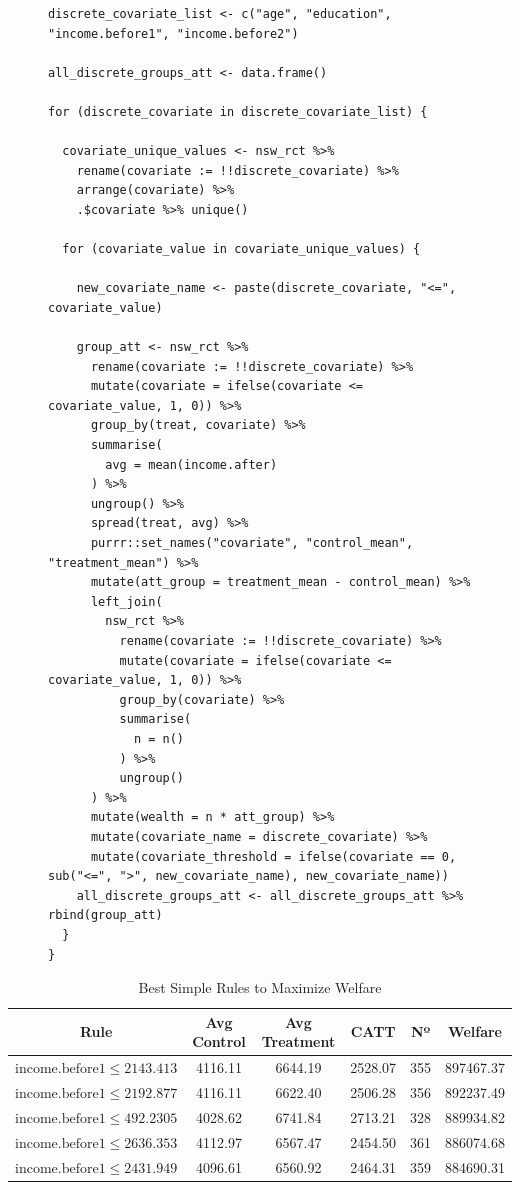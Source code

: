 \documentclass{article}
\begin{document}
\begin{figure}[H]
\centering
\begin{lstlisting}[style=Rstyle, caption=Continous Variables Threshold Search]
discrete_covariate_list <- c("age", "education", "income.before1", "income.before2")

all_discrete_groups_att <- data.frame()

for (discrete_covariate in discrete_covariate_list) {
  
  covariate_unique_values <- nsw_rct %>%
    rename(covariate := !!discrete_covariate) %>%
    arrange(covariate) %>% 
    .$covariate %>% unique()
  
  for (covariate_value in covariate_unique_values) {
    
    new_covariate_name <- paste(discrete_covariate, "<=", covariate_value)
    
    group_att <- nsw_rct %>%
      rename(covariate := !!discrete_covariate) %>% 
      mutate(covariate = ifelse(covariate <= covariate_value, 1, 0)) %>% 
      group_by(treat, covariate) %>% 
      summarise(
        avg = mean(income.after)
      ) %>% 
      ungroup() %>% 
      spread(treat, avg) %>% 
      purrr::set_names("covariate", "control_mean", "treatment_mean") %>% 
      mutate(att_group = treatment_mean - control_mean) %>% 
      left_join(
        nsw_rct %>% 
          rename(covariate := !!discrete_covariate) %>% 
          mutate(covariate = ifelse(covariate <= covariate_value, 1, 0)) %>% 
          group_by(covariate) %>% 
          summarise(
            n = n()
          ) %>% 
          ungroup()
      ) %>% 
      mutate(wealth = n * att_group) %>% 
      mutate(covariate_name = discrete_covariate) %>% 
      mutate(covariate_threshold = ifelse(covariate == 0, sub("<=", ">", new_covariate_name), new_covariate_name))
    all_discrete_groups_att <- all_discrete_groups_att %>% rbind(group_att)
  }
}
\end{lstlisting}
\end{figure}

\begin{table}[H]
    \centering
    \begin{tabular}{|c|c|c|c|c|c|}
    \hline
    \textbf{Rule} & \textbf{Avg Control} & \textbf{Avg Treatment} & \textbf{CATT} &
    \textbf{Nº} & \textbf{Welfare} \\
    \hline
    $\text{income.before1} \leq 2143.413$ & 4116.11 & 6644.19 & 2528.07 & 355 & 897467.37 \\
    $\text{income.before1} \leq 2192.877$ & 4116.11 & 6622.40 & 2506.28 & 356 & 892237.49 \\
    $\text{income.before1} \leq 492.2305$ & 4028.62 & 6741.84 & 2713.21 & 328 & 889934.82 \\
    $\text{income.before1} \leq 2636.353$ & 4112.97 & 6567.47 & 2454.50 & 361 & 886074.68 \\
    $\text{income.before1} \leq 2431.949$ & 4096.61 & 6560.92 & 2464.31 & 359 & 884690.31 \\
    \hline
    \end{tabular}
    \caption{Best Simple Rules to Maximize Welfare}
    \label{tab:earnings_distribution}
\end{table}
\end{document}
